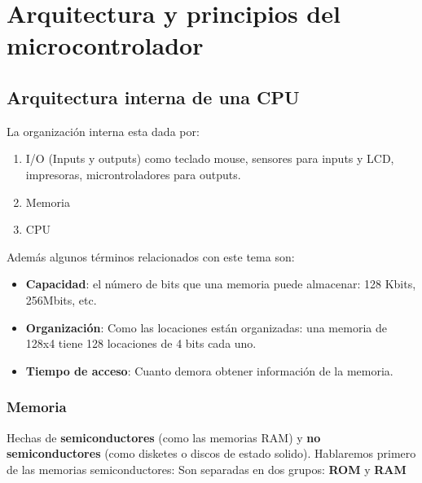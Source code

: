\documentclass[
	12pt, %
	fleqn, %
	a4paper, %
]{LegrandOrangeBook}
\begin{document}
\chapter{Arquitectura y principios del microcontrolador}
\section{Arquitectura interna de una CPU}
La organización interna esta dada por:
\begin{enumerate}
\item I/O (Inputs y outputs) como teclado mouse, sensores para inputs y LCD, impresoras, microntroladores para outputs.
\item Memoria
\item CPU
\end{enumerate}
Además algunos términos relacionados con este tema son:
\begin{itemize}
\item \textbf{Capacidad}: el número de bits que una memoria puede almacenar: 128 Kbits, 256Mbits, etc.
\item \textbf{Organización}: Como las locaciones están organizadas: una memoria de 128x4 tiene 128 locaciones de 4 bits cada uno.
\item \textbf{Tiempo de acceso}: Cuanto demora obtener información de la memoria.
\end{itemize}
\subsection{Memoria}
Hechas de \textbf{semiconductores} (como las memorias RAM) y \textbf{no semiconductores} (como disketes o discos de estado solido). Hablaremos primero de las memorias semiconductores: Son separadas en dos grupos: \textbf{ROM} y \textbf{RAM}
\end{document}
